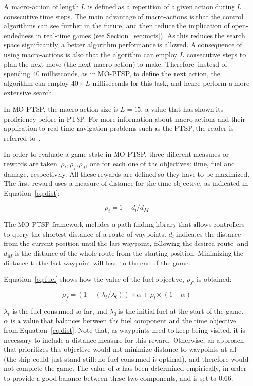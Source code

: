 \documentclass[journal]{IEEEtran}
\begin{document}
A macro-action of length $L$ is defined as a repetition of a given action during $L$ consecutive time steps. The main advantage of macro-actions is that the control algorithms can see further in the future, and then reduce the implication of open-endedness in real-time games (see Section~\ref{sec:mcts}). As this reduces the search space significantly, a better algorithm performance is allowed. A consequence of using macro-actions is also that the algorithm can employ $L$ consecutive steps to plan the next move (the next macro-action) to make. Therefore, instead of spending $40$ milliseconds, as in MO-PTSP, to define the next action, the algorithm can employ $40 \times L$ milliseconds for this task, and hence perform a more extensive search. 

In MO-PTSP, the macro-action size is $L = 15$, a value that has shown its proficiency before in PTSP. For more information about macro-actions and their application to real-time navigation problems such as the PTSP, the reader is referred to~\cite{Perez2013}.

In order to evaluate a game state in MO-PTSP, three different measures or rewards are taken, $\rho_t, \rho_f, \rho_d$, one for each one of the objectives: time, fuel and damage, respectively. All these rewards are defined so they have to be maximized. The first reward uses a measure of distance for the time objective, as indicated in Equation~\ref{eq:dist}: 

\begin{equation}	\label{eq:dist}
\rho_t = 1 - d_t/d_M
\end{equation}

The MO-PTSP framework includes a path-finding library that allows controllers to query the shortest distance of a route of waypoints. $d_t$ indicates the distance from the current position until the last waypoint, following the desired route, and $d_M$ is the distance of the whole route from the starting position. Minimizing the distance to the last waypoint will lead to the end of the game.

Equation~\ref{eq:fuel} shows how the value of the fuel objective, $\rho_f$, is obtained:


\begin{equation}	\label{eq:fuel}
\rho_f = (1 - (\lambda_t/\lambda_0)) \times \alpha + \rho_t \times (1 - \alpha)
\end{equation}

$\lambda_t$ is the fuel consumed so far, and $\lambda_0$ is the initial fuel at the start of the game. $\alpha$ is a value that balances between the fuel component and the time objective from Equation~\ref{eq:dist}. Note that, as waypoints need to keep being visited, it is necessary to include a distance measure for this reward. Otherwise, an approach that prioritizes this objective would not minimize distance to waypoints at all (the ship could just stand still: no fuel consumed is optimal), and therefore would not complete the game. The value of $\alpha$ has been determined empirically, in order to provide a good balance between these two components, and is set to $0.66$.
\end{document}
